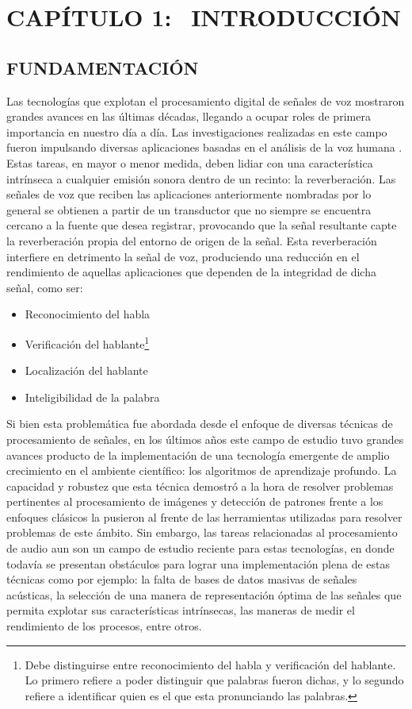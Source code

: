 \section[Introducción]{CAPÍTULO 1:$\ \ \ \ $INTRODUCCIÓN} 

\subsection[Fundamentación]{FUNDAMENTACIÓN}
Las tecnologías que explotan el procesamiento digital de señales de voz mostraron grandes avances en las últimas décadas, llegando a ocupar roles de primera importancia en nuestro día a día. Las investigaciones realizadas en este campo fueron impulsando diversas aplicaciones basadas en el análisis de la voz humana \cite{fun1}\cite{fun2}. 
Estas tareas, en mayor o menor medida, deben lidiar con una característica intrínseca a cualquier emisión sonora dentro de un recinto: la reverberación. Las señales de voz que reciben las aplicaciones anteriormente nombradas por lo general se obtienen a partir de un transductor que no siempre se encuentra cercano a la fuente que desea registrar, provocando que la señal resultante capte la reverberación propia del entorno de origen de la señal. Esta reverberación interfiere en detrimento la señal de voz, produciendo una reducción en el rendimiento de aquellas aplicaciones que dependen de la integridad de dicha señal, como ser: 

\begin{itemize}
    \item Reconocimiento del habla \cite{reconocimiento}
    \item Verificación del hablante\footnote{Debe distinguirse entre reconocimiento del habla y verificación del hablante. Lo primero refiere a poder distinguir que palabras fueron dichas, y lo segundo refiere a identificar quien es el que esta pronunciando las palabras.} \cite{verificacion}
    
    \item Localización del hablante \cite{localizacion}
    \item Inteligibilidad de la palabra
\end{itemize}


Si bien esta problemática fue abordada desde el enfoque de diversas técnicas de procesamiento de señales, en los últimos años este campo de estudio tuvo grandes avances producto de la implementación de una tecnología emergente de amplio crecimiento en el ambiente científico: los algoritmos de aprendizaje profundo. La capacidad y robustez que esta técnica demostró a la hora de resolver problemas pertinentes al procesamiento de imágenes y detección de patrones frente a los enfoques clásicos la pusieron al frente de las herramientas utilizadas para resolver problemas de este ámbito. Sin embargo, las tareas relacionadas al procesamiento de audio aun son un campo de estudio reciente para estas tecnologías, en donde todavía se presentan obstáculos para lograr una implementación plena de estas técnicas como por ejemplo: la falta de bases de datos masivas de señales acústicas, la selección de una manera de representación óptima de las señales que permita explotar sus características intrínsecas, las maneras de medir el rendimiento de los procesos, entre otros.

